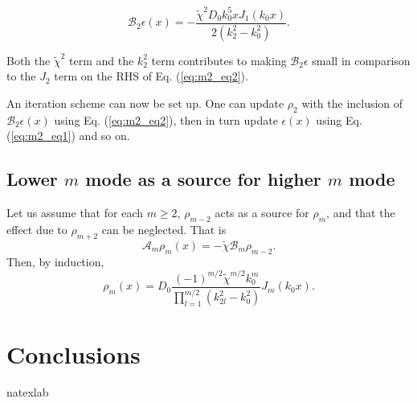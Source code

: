 \documentclass[apj]{emulateapj}
\newcommand{\Eq}[1]{Eq. (\ref{#1})}
\newcommand{\eq}[1]{\Eq{#1}}
\newcommand{\Fig}[1]{Fig.~\ref{#1}}
\newcommand{\fig}[1]{\Fig{#1}}
\newcommand{\beq}{\begin{equation}}
\newcommand{\eeq}{\end{equation}}
\begin{document}
\beq
\mathcal{B}_2\epsilon(x) =
-\frac{\tilde{\chi}^2D_0k_0^5xJ_1(k_0x)}{2\left(k_2^2 -
  k_0^2\right)}. 
\eeq

Both the $\tilde{\chi}^2$ term and the $k_2^2$ term contributes to
making $\mathcal{B}_2\epsilon$ small in comparison to the $J_2$ term
on the RHS of \eq{eq:m2_eq2}. 

An iteration scheme can now be set up. One can update
$\rho_2$ with the inclusion of $\mathcal{B}_2\epsilon(x)$ using
\eq{eq:m2_eq2}, then in turn update $\epsilon(x)$ using
\eq{eq:m2_eq1} and so on. 


\subsection{Lower $m$ mode as a source for higher $m$ mode}
Let us assume that for each $m\geq2$, $\rho_{m-2}$ acts as a source
for $\rho_{m}$, and that the effect due to $\rho_{m+2}$ can be
neglected. That is
\beq
\mathcal{A}_m\rho_m(x) = -\tilde{\chi}\mathcal{B}_m\rho_{m-2}. 
\eeq 
Then, by induction,
\beq
\rho_m(x) =D_0
\frac{(-1)^{m/2}\tilde{\chi}^{m/2}k_0^m}{\prod_{l=1}^{m/2}(k_{2l}^2-k_0^2)}J_m(k_0x). 
\eeq


\section{Conclusions}

\acknowledgments

\begin{thebibliography}{}
\expandafter\ifx\csname natexlab\endcsname\relax\def\natexlab#1{#1}\fi
\end{thebibliography}
\end{document}
